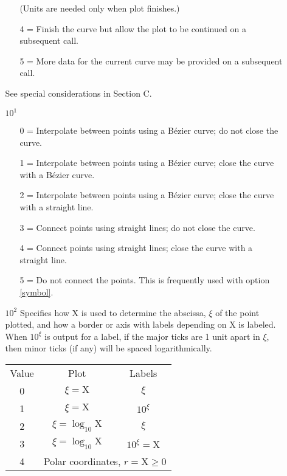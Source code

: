 \documentclass[twoside]{MATH77}
\begin{document}
\begin{multicols}{2}
\begin{enumerate}
\begin{itemize}
\begin{itemize}
          (Units are needed only when plot finishes.)
   \item[4 =] Finish the curve but allow the plot to be continued on a
          subsequent call.
   \item[5 =] More data for the current curve may be provided on a
          subsequent call.
   \end{itemize}
        See special considerations in Section C.
  \item[$10^1$]
    \begin{itemize}
    \item[0 =] Interpolate between points using a B\'ezier curve; do not
          close the curve.
    \item[1 =] Interpolate between points using a B\'ezier curve; close
          the curve with a B\'ezier curve.
    \item[2 =] Interpolate between points using a B\'ezier curve; close
          the curve with a straight line.
    \item[3 =] Connect points using straight lines; do not close the
          curve.
    \item[4 =] Connect points using straight lines; close the curve with a
          straight line.
    \item[5 =] Do not connect the points.  This is frequently used with
         option \ref{symbol}.
   \end{itemize}
  \item[$10^2$]
    Specifies how X is used to determine the abscissa, $\xi$ of the point
    plotted, and how a border or axis with labels depending on X is
    labeled.  When $10^\xi$ is output for a label, if the
    major ticks are 1 unit apart in $\xi$, then minor ticks
    (if any) will be spaced logarithmically.
    \newline

    \hspace{.25in}\begin{tabular}{ccc}
    Value & Plot & Labels\\
    0 & $\xi = \text{X}$ & $\xi$\\
    1 & $\xi = \text{X}$ & $10^\xi$\\
    2 & $\xi = \log_{10}\text{X}$ & $\xi$ \\
    3 & $\xi = \log_{10}\text{X}$ & $10^\xi = \text{X}$ \\
    4 & \multicolumn{2}{l}{Polar coordinates, $r = \text{X}\geq 0$}\\
    \end{tabular}\newline


\end{itemize}
\end{enumerate}
\end{multicols}
\end{document}
